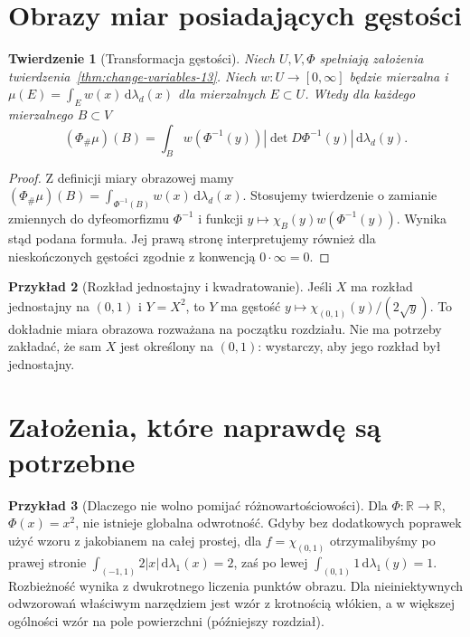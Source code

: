 \documentclass[11pt,a4paper,oneside]{book}
\numberwithin{equation}{chapter}
\theoremstyle{plain}
\newtheorem{twierdzenie}{Twierdzenie}[chapter]
\theoremstyle{definition}
\newtheorem{przyklad}[twierdzenie]{Przykład}
\theoremstyle{remark}
\begin{document}
\section{Obrazy miar posiadających gęstości}
\begin{twierdzenie}[Transformacja gęstości]
\label{thm:density-transform-13}
Niech $U,V,\Phi$ spełniają założenia
twierdzenia~\ref{thm:change-variables-13}.
Niech $w:U\to[0,\infty]$ będzie mierzalna i
$\mu(E)=\int_Ew(x)\,\mathrm d\lambda_d(x)$
dla mierzalnych $E\subset U$.
Wtedy dla każdego mierzalnego $B\subset V$
\[
(\Phi_\#\mu)(B)=\int_B
w(\Phi^{-1}(y))|\det D\Phi^{-1}(y)|\,
\mathrm d\lambda_d(y).
\]
\end{twierdzenie}
\begin{proof}
Z definicji miary obrazowej mamy
$(\Phi_\#\mu)(B)=\int_{\Phi^{-1}(B)}w(x)\,
\mathrm d\lambda_d(x)$. Stosujemy twierdzenie
o zamianie zmiennych do dyfeomorfizmu $\Phi^{-1}$
i funkcji $y\mapsto\chi_B(y)w(\Phi^{-1}(y))$.
Wynika stąd podana formuła. Jej prawą stronę
interpretujemy również dla nieskończonych gęstości
zgodnie z konwencją $0\cdot\infty=0$.
\end{proof}

\begin{przyklad}[Rozkład jednostajny i kwadratowanie]
Jeśli $X$ ma rozkład jednostajny na $(0,1)$ i
$Y=X^2$, to $Y$ ma gęstość
$y\mapsto\chi_{(0,1)}(y)/(2\sqrt y)$.
To dokładnie miara obrazowa rozważana na początku rozdziału.
Nie ma potrzeby zakładać, że sam $X$ jest określony
na $(0,1)$: wystarczy, aby jego rozkład był jednostajny.
\end{przyklad}

\section{Założenia, które naprawdę są potrzebne}
\begin{przyklad}[Dlaczego nie wolno pomijać różnowartościowości]
Dla $\Phi:\mathbb R\to\mathbb R$, $\Phi(x)=x^2$,
nie istnieje globalna odwrotność. Gdyby bez dodatkowych
poprawek użyć wzoru z jakobianem na całej prostej, dla
$f=\chi_{(0,1)}$ otrzymalibyśmy po prawej stronie
$\int_{(-1,1)}2|x|\,\mathrm d\lambda_1(x)=2$,
zaś po lewej $\int_{(0,1)}1\,\mathrm d\lambda_1(y)=1$.
Rozbieżność wynika z dwukrotnego liczenia punktów obrazu.
Dla nieiniektywnych odwzorowań właściwym narzędziem
jest wzór z krotnością włókien, a w większej ogólności
wzór na pole powierzchni (późniejszy rozdział).
\end{przyklad}
\end{document}
